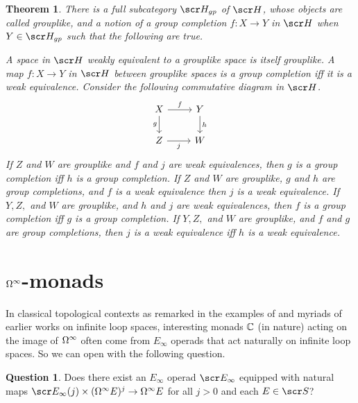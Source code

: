\documentclass{amsart}
\newtheorem{thm}{Theorem}[section]
\theoremstyle{definition}
\newtheorem{quest}[defn]{Question}
\begin{document}
\begin{thm}
There is a full subcategory $\sH_{gp}$ of $\sH$, whose objects are called grouplike, and a notion of a group completion $f : X \to Y$ in $\sH$ when $Y \in \sH_{gp}$ such that the following are true.
\begin{outline}[enumerate]
\1 A space in $\sH$ weakly equivalent to a grouplike space is itself grouplike.
\1 A map $f: X \to Y$ in $\sH$ between grouplike spaces is a group completion iff it is a weak equivalence.
\1 Consider the following commutative diagram in $\sH$.
\[\begin{tikzcd}
X \arrow[d, "g"'] \arrow[r, "f"] & Y \arrow[d, "h"] \\
Z \arrow[r, "j"']                & W               
\end{tikzcd}\]
    \2 If $Z$ and $W$ are grouplike and $f$ and $j$ are weak equivalences, then $g$ is a group completion iff $h$ is a group completion.
    \2 If $Z$ and $W$ are grouplike, $g$ and $h$ are group completions, and $f$ is a weak equivalence then $j$ is a weak equivalence.
    \2 If $Y, Z,$ and $W$ are grouplike, and $h$ and $j$ are weak equivalences, then $f$ is a group completion iff $g$ is a group completion.
    \2 If $Y, Z,$ and $W$ are grouplike, and $f$ and $g$ are group completions, then $j$ is a weak equivalence iff $h$ is a weak equivalence.
\end{outline}
\end{thm}

\section{$\Omega^{\infty}$-monads}\label{sec:assna2}

In classical topological contexts as remarked in the examples of \cite{kong2024group} and myriads of earlier works on infinite loop spaces, interesting monads $\mathbb{C}$ (in nature) acting on the image of $\Omega^{\infty}$ often come from $E_{\infty}$ operads that act naturally on infinite loop spaces. So we can open with the following question. 
\begin{quest}\label{qn:oper}
Does there exist an $E_{\infty}$ operad $\sE_{\infty}$ equipped with natural maps $\sE_{\infty}(j) \times (\OM^{\infty}E)^j \to \OM^{\infty}E$ for all $j>0$ and each $E \in \sS$?
\end{quest}
\end{document}
